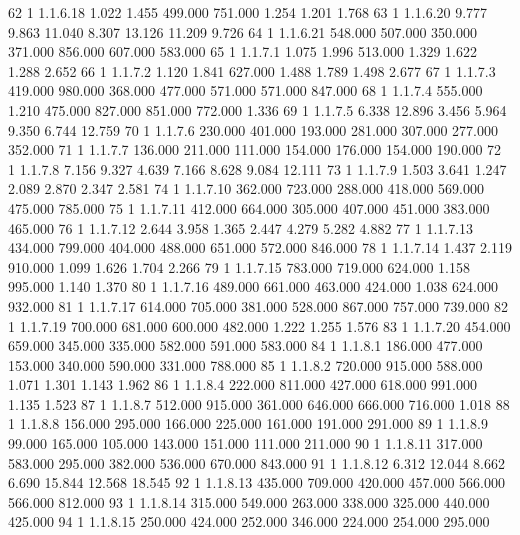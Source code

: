 \documentclass[12pt]{article}
\begin{document}
\begin{Schunk}
\begin{Soutput}
62      1     1.1.6.18   1.022   1.455 499.000 751.000   1.254   1.201   1.768
63      1     1.1.6.20   9.777   9.863  11.040   8.307  13.126  11.209   9.726
64      1     1.1.6.21 548.000 507.000 350.000 371.000 856.000 607.000 583.000
65      1      1.1.7.1   1.075   1.996 513.000   1.329   1.622   1.288   2.652
66      1      1.1.7.2   1.120   1.841 627.000   1.488   1.789   1.498   2.677
67      1      1.1.7.3 419.000 980.000 368.000 477.000 571.000 571.000 847.000
68      1      1.1.7.4 555.000   1.210 475.000 827.000 851.000 772.000   1.336
69      1      1.1.7.5   6.338  12.896   3.456   5.964   9.350   6.744  12.759
70      1      1.1.7.6 230.000 401.000 193.000 281.000 307.000 277.000 352.000
71      1      1.1.7.7 136.000 211.000 111.000 154.000 176.000 154.000 190.000
72      1      1.1.7.8   7.156   9.327   4.639   7.166   8.628   9.084  12.111
73      1      1.1.7.9   1.503   3.641   1.247   2.089   2.870   2.347   2.581
74      1     1.1.7.10 362.000 723.000 288.000 418.000 569.000 475.000 785.000
75      1     1.1.7.11 412.000 664.000 305.000 407.000 451.000 383.000 465.000
76      1     1.1.7.12   2.644   3.958   1.365   2.447   4.279   5.282   4.882
77      1     1.1.7.13 434.000 799.000 404.000 488.000 651.000 572.000 846.000
78      1     1.1.7.14   1.437   2.119 910.000   1.099   1.626   1.704   2.266
79      1     1.1.7.15 783.000 719.000 624.000   1.158 995.000   1.140   1.370
80      1     1.1.7.16 489.000 661.000 463.000 424.000   1.038 624.000 932.000
81      1     1.1.7.17 614.000 705.000 381.000 528.000 867.000 757.000 739.000
82      1     1.1.7.19 700.000 681.000 600.000 482.000   1.222   1.255   1.576
83      1     1.1.7.20 454.000 659.000 345.000 335.000 582.000 591.000 583.000
84      1      1.1.8.1 186.000 477.000 153.000 340.000 590.000 331.000 788.000
85      1      1.1.8.2 720.000 915.000 588.000   1.071   1.301   1.143   1.962
86      1      1.1.8.4 222.000 811.000 427.000 618.000 991.000   1.135   1.523
87      1      1.1.8.7 512.000 915.000 361.000 646.000 666.000 716.000   1.018
88      1      1.1.8.8 156.000 295.000 166.000 225.000 161.000 191.000 291.000
89      1      1.1.8.9  99.000 165.000 105.000 143.000 151.000 111.000 211.000
90      1     1.1.8.11 317.000 583.000 295.000 382.000 536.000 670.000 843.000
91      1     1.1.8.12   6.312  12.044   8.662   6.690  15.844  12.568  18.545
92      1     1.1.8.13 435.000 709.000 420.000 457.000 566.000 566.000 812.000
93      1     1.1.8.14 315.000 549.000 263.000 338.000 325.000 440.000 425.000
94      1     1.1.8.15 250.000 424.000 252.000 346.000 224.000 254.000 295.000

\end{Soutput}
\end{Schunk}
\end{document}
